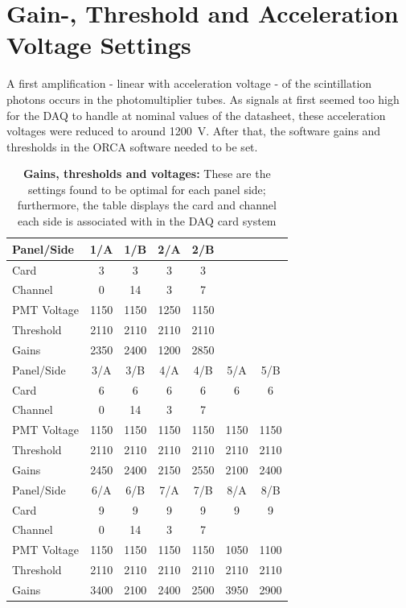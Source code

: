   \section{Gain-, Threshold and Acceleration Voltage Settings}
  \label{ch:Analysis:sec:GainsThresholdsAccVoltages}
  A first amplification - linear with acceleration voltage - of the scintillation photons occurs in the photomultiplier tubes. As signals at first seemed too high for the DAQ to handle at nominal values of the datasheet, these acceleration voltages were reduced to around \SI{1200}{\volt}. After that, the software gains and thresholds in the ORCA software needed to be set. 
    \begin{table}
    
    \centering
    \begin{tabular}{|l|cccccc|}
      \hline
      Panel/Side 	&1/A 	&1/B	&2/A	&2/B	&	&	\\
      \hline
      Card 	&3	&3	&3	&3	&	&	\\
      Channel	&0	&14	&3	&7	&	&	\\
      PMT Voltage	&1150	&1150	&1250	&1150	&	&	\\
      Threshold	&2110	&2110	&2110	&2110	&	&	\\
      Gains	&2350	&2400	&1200	&2850	&	&	\\
      \hline
      Panel/Side 	&3/A 	&3/B	&4/A	&4/B	&5/A	&5/B	\\
      \hline
      Card 	&6	&6	&6	&6	&6	&6	\\
      Channel	&0	&14	&3	&7	&	&	\\
      PMT Voltage	&1150	&1150	&1150	&1150	&1150	&1150   \\
      Threshold	&2110	&2110	&2110	&2110	&2110	&2110   \\
      Gains	&2450	&2400	&2150	&2550	&2100	&2400   \\
      \hline
      Panel/Side 	&6/A 	&6/B	&7/A	&7/B	&8/A	&8/B	\\
      \hline
      Card 	&9	&9	&9	&9	&9	&9	\\
      Channel	&0	&14	&3	&7	&	&	\\
      PMT Voltage	&1150	&1150	&1150	&1150	&1050	&1100	\\
      Threshold	&2110	&2110	&2110	&2110	&2110	&2110   \\
      Gains	&3400	&2100	&2400	&2500	&3950	&2900   \\
      \hline
    

   \end{tabular}
  \caption[Gains - thresholds - acceleration voltages]{{\bf Gains, thresholds and voltages:} These are the settings found to be optimal for each panel side; furthermore, the table displays the card and channel each side is associated with in the DAQ card system}
  \end{table}
